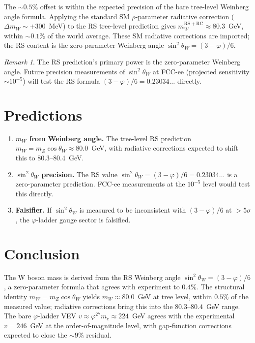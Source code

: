 \documentclass[12pt,a4paper]{article}
\theoremstyle{definition}
\theoremstyle{remark}
\newtheorem{remark}[theorem]{Remark}
\begin{document}
The $\sim 0.5\%$ offset is within the expected precision of the bare
tree-level Weinberg angle formula.  Applying the standard SM
$\rho$-parameter radiative correction ($\Delta m_W \sim +300$~MeV)
to the RS tree-level prediction gives $m_W^{\mathrm{RS+RC}} \approx
80.3$~GeV, within $\sim 0.1\%$ of the world average.  These SM
radiative corrections are imported; the RS content is the zero-parameter
Weinberg angle $\sin^2\theta_W = (3-\varphi)/6$.

\begin{remark}
The RS prediction's primary power is the zero-parameter Weinberg angle.
Future precision measurements of $\sin^2\theta_W$ at FCC-ee (projected
sensitivity $\sim 10^{-5}$) will test the RS formula
$(3-\varphi)/6 = 0.23034\ldots$ directly.
\end{remark}

\section{Predictions}
\label{sec:predict}

\begin{enumerate}
  \item \textbf{$m_W$ from Weinberg angle.}  The tree-level RS
  prediction $m_W = m_Z\cos\theta_W \approx 80.0$~GeV, with
  radiative corrections expected to shift this to
  $80.3$--$80.4$~GeV.

  \item \textbf{$\sin^2\theta_W$ precision.}  The RS value
  $\sin^2\theta_W = (3-\varphi)/6 = 0.23034\ldots$ is a
  zero-parameter prediction.  FCC-ee measurements at the
  $10^{-5}$ level would test this directly.

  \item \textbf{Falsifier.}  If $\sin^2\theta_W$ is measured to be
  inconsistent with $(3-\varphi)/6$ at $> 5\sigma$, the
  $\varphi$-ladder gauge sector is falsified.
\end{enumerate}

\section{Conclusion}
\label{sec:conclusion}

The W boson mass is derived from the RS Weinberg angle
$\sin^2\theta_W = (3-\varphi)/6$, a zero-parameter formula that
agrees with experiment to $0.4\%$.  The structural identity
$m_W = m_Z\cos\theta_W$ yields $m_W \approx 80.0$~GeV at tree level,
within $0.5\%$ of the measured value; radiative corrections bring
this into the $80.3$--$80.4$~GeV range.  The bare $\varphi$-ladder
VEV $v \approx \varphi^{27}m_e \approx 224$~GeV agrees with the
experimental $v = 246$~GeV at the order-of-magnitude level, with
gap-function corrections expected to close the $\sim 9\%$ residual.
\end{document}

